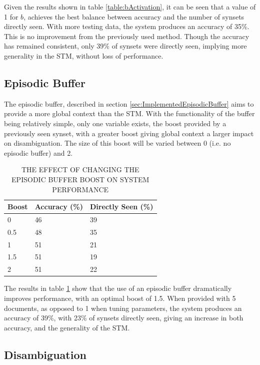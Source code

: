 \documentclass[]{article}
\begin{document}
Given the results shown in table \ref{table:bActivation}, it can be seen that a value of 1 for $b$, achieves the best balance between accuracy and the number of synsets directly seen. With more testing data, the system produces an accuracy of 35\%. This is no improvement from the previously used method. Though the accuracy has remained consistent, only 39\% of synsets were directly seen, implying more generality in the STM, without loss of performance.

\subsection{Episodic Buffer}
\label{sec:EvEpisodicBuffer}
The episodic buffer, described in section \ref{sec:ImplementedEpisodicBuffer} aims to provide a more global context than the STM. With the functionality of the buffer being relatively simple, only one variable exists, the boost provided by a previously seen synset, with a greater boost giving global context a larger impact on disambiguation. The size of this boost will be varied between 0 (i.e. no episodic buffer) and 2.

\begin{table}
\begin{center}
\begin{tabular}{|p{2em}|p{7em}|p{7em}|}
	\hline
	Boost & Accuracy (\%) & Directly Seen (\%) \\
	\hline
	0 & 46 & 39\\
	\hline
	0.5 & 48 & 35\\
	\hline
	1 & 51 & 21\\
	\hline
	1.5 & 51 & 19\\
	\hline
	2 & 51 & 22\\
	\hline
\end{tabular}
\end{center}
\caption{THE EFFECT OF CHANGING THE EPISODIC BUFFER BOOST ON SYSTEM PERFORMANCE}
\label{table:EBboost}
\end{table}

The results in table \ref{table:EBboost} show that the use of an episodic buffer dramatically improves performance, with an optimal boost of 1.5. When provided with 5 documents, as opposed to 1 when tuning parameters, the system produces an accuracy of 39\%, with 23\% of synsets directly seen, giving an increase in both accuracy, and the generality of the STM. 

\subsection{Disambiguation}
\label{sec:EvDisambiguation}
\end{document}

